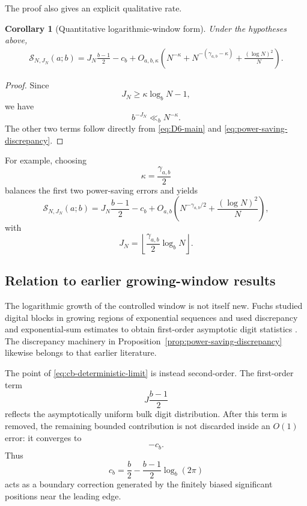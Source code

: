 \documentclass[11pt]{article}
\newtheorem{corollary}[theorem]{Corollary}
\theoremstyle{definition}
\theoremstyle{remark}
\begin{document}
The proof also gives an explicit qualitative rate.

\begin{corollary}[Quantitative logarithmic-window form]
\label{cor:quantitative-log-window}
Under the hypotheses above,
\begin{equation}
\begin{aligned}
    \mathcal S_{N,J_N}(a;b)
    =
    J_N\frac{b-1}{2}
    -
    c_b
    +
    O_{a,b,\kappa}
    \left(
        N^{-\kappa}
        +
        N^{-(\gamma_{a,b}-\kappa)}
        +
        \frac{(\log N)^2}{N}
    \right).
    \label{eq:quantitative-log-window}
\end{aligned}
\end{equation}
\end{corollary}

\begin{proof}
Since
\[
    J_N
    \ge
    \kappa\log_bN-1,
\]
we have
\[
    b^{-J_N}
    \ll_b N^{-\kappa}.
\]
The other two terms follow directly from
\eqref{eq:D6-main} and
\eqref{eq:power-saving-discrepancy}.
\end{proof}

For example, choosing
\[
    \kappa=\frac{\gamma_{a,b}}2
\]
balances the first two power-saving errors and yields
\begin{equation}
    \mathcal S_{N,J_N}(a;b)
    =
    J_N\frac{b-1}{2}
    -
    c_b
    +
    O_{a,b}
    \left(
        N^{-\gamma_{a,b}/2}
        +
        \frac{(\log N)^2}{N}
    \right),
    \label{eq:balanced-log-window}
\end{equation}
with
\[
    J_N
    =
    \left\lfloor
        \frac{\gamma_{a,b}}2
        \log_bN
    \right\rfloor.
\]


\subsection{Relation to earlier growing-window results}
\label{subsec:fuchs-comparison}

The logarithmic growth of the controlled window is not itself new.
Fuchs studied digital blocks in growing regions of exponential
sequences and used discrepancy and exponential-sum estimates to obtain
first-order asymptotic digit statistics
\cite{Fuchs2002}.
The discrepancy machinery in
Proposition~\ref{prop:power-saving-discrepancy}
likewise belongs to that earlier literature.

The point of
\eqref{eq:cb-deterministic-limit}
is instead second-order.
The first-order term
\[
    J\frac{b-1}{2}
\]
reflects the asymptotically uniform bulk digit distribution.
After this term is removed, the remaining bounded contribution is not
discarded inside an \(O(1)\) error: it converges to
\[
    -c_b.
\]
Thus
\[
    c_b
    =
    \frac b2
    -
    \frac{b-1}{2}\log_b(2\pi)
\]
acts as a boundary correction generated by the finitely biased
significant positions near the leading edge.
\end{document}
